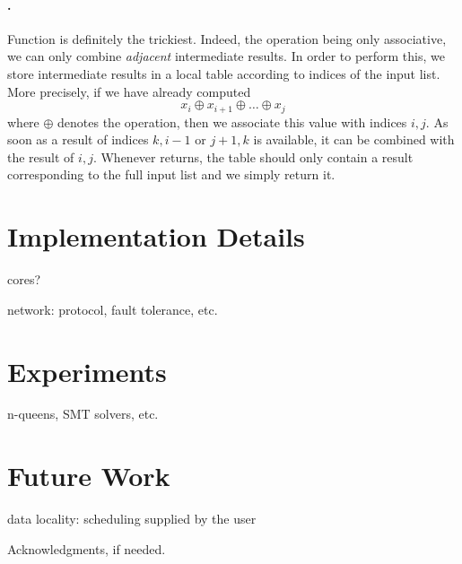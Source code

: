 \documentclass[preprint]{sigplanconf}
\begin{document}
\paragraph{.}
Function  is definitely the trickiest. Indeed, the
operation being only associative, we can only combine \emph{adjacent}
intermediate results. In order to perform this, we store intermediate
results in a local table according to indices of the input list. More
precisely, if we have already computed
\begin{displaymath}
  x_i \oplus x_{i+1} \oplus \dots \oplus x_j
\end{displaymath}
where $\oplus$ denotes the  operation, then we associate this
value with indices $i,j$. As soon as a result of indices $k,i-1$ or
$j+1,k$ is available, it can be combined with the result of $i,j$.
Whenever  returns, the table should only contain a result
corresponding to the full input list and we simply return it.

\section{Implementation Details}

cores?

network: protocol, fault tolerance, etc.

\section{Experiments}

n-queens, SMT solvers, etc.

\section{Future Work}

data locality: scheduling supplied by the user



\acks

Acknowledgments, if needed.


\nocite{*}


\end{document}
